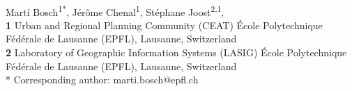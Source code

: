 \documentclass[10pt,letterpaper]{article}
\begin{document}
\vspace*{0.35in}

\begin{flushleft}
{\Large
\textbf{}
}
\newline
\\
Mart\'i Bosch\textsuperscript{1*},
J\'er\^ome Chenal\textsuperscript{1},
St\'ephane Joost\textsuperscript{2,1},
\\
\bigskip
\textbf{1} Urban and Regional Planning Community (CEAT) \'Ecole Polytechnique F\'ed\'erale de Lausanne (EPFL), Lausanne, Switzerland
\\
\textbf{2} Laboratory of Geographic Information Systems (LASIG) \'Ecole Polytechnique F\'ed\'erale de Lausanne (EPFL), Lausanne, Switzerland
\\
\bigskip
* Corresponding author: marti.bosch@epfl.ch

\end{flushleft}
\end{document}
